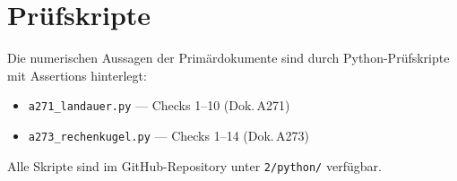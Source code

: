 \section*{Prüfskripte}

Die numerischen Aussagen der Primärdokumente sind durch Python-Prüfskripte
mit Assertions hinterlegt:
\begin{itemize}
  \item \texttt{a271\_landauer.py} --- Checks 1--10 (Dok.\,A271)
  \item \texttt{a273\_rechenkugel.py} --- Checks 1--14 (Dok.\,A273)
\end{itemize}
Alle Skripte sind im GitHub-Repository unter \texttt{2/python/} verfügbar.

